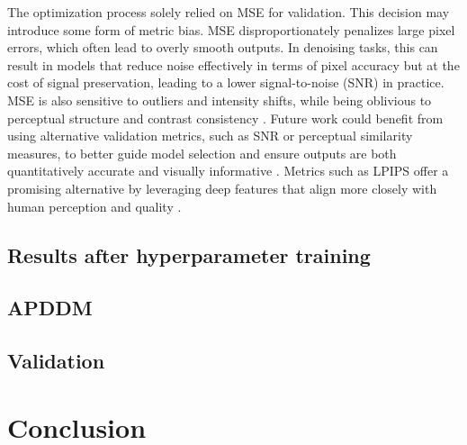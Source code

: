 \documentclass[twocolumn]{article}
\begin{document}
The optimization process solely relied on MSE for validation. This decision may introduce some form of metric bias. 
MSE disproportionately penalizes large pixel errors, which often lead to overly smooth outputs. 
In denoising tasks, this can result in models that reduce noise effectively in terms of pixel accuracy but at the cost of signal preservation, leading to a lower signal-to-noise (SNR) in practice. 
MSE is also sensitive to outliers and intensity shifts, while being oblivious to perceptual structure and contrast consistency \cite{1284395}. 
Future work could benefit from using alternative validation metrics, such as SNR or perceptual similarity measures, to better guide model selection and ensure outputs are both quantitatively accurate and visually informative \cite{chavhan2009t2star}. 
Metrics such as LPIPS offer a promising alternative by leveraging deep features that align more closely with human perception and quality \cite{zhang2018unreasonableeffectivenessdeepfeatures}.

\subsection{Results after hyperparameter training}

\subsection{APDDM}

\subsection{Validation}

\section{Conclusion}
\end{document}

